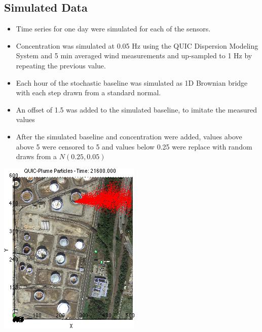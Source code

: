 \documentclass[a0, landscape]{a0poster}
\begin{document}
\begin{multicols}{3}
\section*{Simulated Data}
\begin{minipage}{.14\textwidth}
\begin{itemize}
	\item Time series for one day were simulated for each of the sensors.  
	\item Concentration was simulated at 0.05 Hz using the QUIC Dispersion Modeling System \cite{QUIC} and 5 min averaged wind measurements and up-sampled to 1 Hz by repeating the previous value. 
	\item Each hour of the stochastic baseline was simulated as 1D Brownian bridge with each step drawn from a standard normal.
	\item An offset of 1.5 was added to the simulated baseline, to imitate the measured values
	\item After the simulated baseline and concentration were added, values above above 5 were censored to 5 and values below 0.25 were replace with random draws from a $N(0.25, 0.05)$ 
\end{itemize}
\end{minipage}
\hfill
\begin{minipage}{.15\textwidth}
	\begin{center}			
		\includegraphics[width=\linewidth]{QUIC_fig}
	\end{center}
\end{minipage}


\end{multicols}
\end{document}
